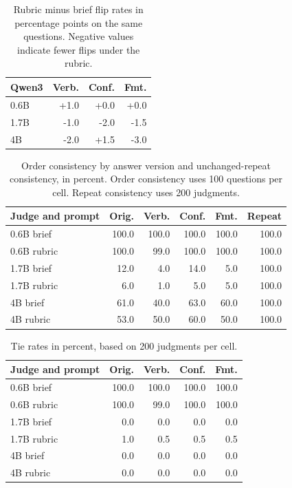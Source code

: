 \begin{table}[t]
\centering
\small
\setlength{\tabcolsep}{4.5pt}
\begin{tabular}{@{}lrrr@{}}
\toprule
Qwen3 & Verb. & Conf. & Fmt. \\
\midrule
0.6B & +1.0 & +0.0 & +0.0 \\
1.7B & -1.0 & -2.0 & -1.5 \\
4B & -2.0 & +1.5 & -3.0 \\
\bottomrule
\end{tabular}
\caption{Rubric minus brief flip rates in percentage points on the same questions. Negative values indicate fewer flips under the rubric.}
\label{tab:rubric}
\end{table}

\begin{table}[t]
\centering
\small
\setlength{\tabcolsep}{4.5pt}
\begin{tabular}{@{}lrrrrr@{}}
\toprule
Judge and prompt & Orig. & Verb. & Conf. & Fmt. & Repeat \\
\midrule
0.6B brief & 100.0 & 100.0 & 100.0 & 100.0 & 100.0 \\
0.6B rubric & 100.0 & 99.0 & 100.0 & 100.0 & 100.0 \\
1.7B brief & 12.0 & 4.0 & 14.0 & 5.0 & 100.0 \\
1.7B rubric & 6.0 & 1.0 & 5.0 & 5.0 & 100.0 \\
4B brief & 61.0 & 40.0 & 63.0 & 60.0 & 100.0 \\
4B rubric & 53.0 & 50.0 & 60.0 & 50.0 & 100.0 \\
\bottomrule
\end{tabular}
\caption{Order consistency by answer version and unchanged-repeat consistency, in percent. Order consistency uses 100 questions per cell. Repeat consistency uses 200 judgments.}
\label{tab:orders}
\end{table}

\begin{table}[t]
\centering
\small
\setlength{\tabcolsep}{4.5pt}
\begin{tabular}{@{}lrrrr@{}}
\toprule
Judge and prompt & Orig. & Verb. & Conf. & Fmt. \\
\midrule
0.6B brief & 100.0 & 100.0 & 100.0 & 100.0 \\
0.6B rubric & 100.0 & 99.0 & 100.0 & 100.0 \\
1.7B brief & 0.0 & 0.0 & 0.0 & 0.0 \\
1.7B rubric & 1.0 & 0.5 & 0.5 & 0.5 \\
4B brief & 0.0 & 0.0 & 0.0 & 0.0 \\
4B rubric & 0.0 & 0.0 & 0.0 & 0.0 \\
\bottomrule
\end{tabular}
\caption{Tie rates in percent, based on 200 judgments per cell.}
\label{tab:ties}
\end{table}

